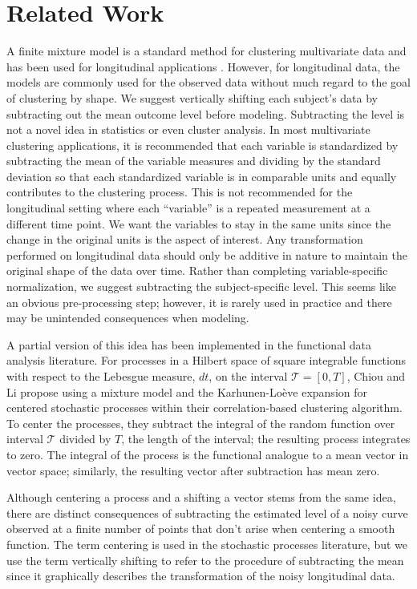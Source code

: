 \documentclass[12pt]{article}
\begin{document}
\section{Related Work}
A finite mixture model is a standard method for clustering multivariate data \cite{everitt2009} and has been used for longitudinal applications \cite{muthen2010, jones2001}. However, for longitudinal data, the models are commonly used for the observed data without much regard to the goal of clustering by shape. We suggest vertically shifting each subject's data by subtracting out the mean outcome level before modeling. Subtracting the level is not a novel idea in statistics or even cluster analysis. In most multivariate clustering applications, it is recommended that each variable is standardized by subtracting the mean of the variable measures and dividing by the standard deviation so that each standardized variable is in comparable units and equally contributes to the clustering process. This is not recommended for the longitudinal setting where each ``variable'' is a repeated measurement at a different time point. We want the variables to stay in the same units since the change in the original units is the aspect of interest. Any transformation performed on longitudinal data should only be additive in nature to maintain the original shape of the data over time. Rather than completing variable-specific normalization, we suggest subtracting the subject-specific level. This seems like an obvious pre-processing step; however, it is rarely used in practice and there may be unintended consequences when modeling.

A partial version of this idea has been implemented in the functional data analysis literature. For processes in a Hilbert space of square integrable functions with respect to the Lebesgue measure, $dt$, on the interval $\mathcal{T}=[0,T]$, Chiou and Li \cite{chiou2008} propose using a mixture model and the Karhunen-Lo{\`e}ve expansion for centered stochastic processes within their correlation-based clustering algorithm. To center the processes, they subtract the integral of the random function over interval $\mathcal{T}$ divided by $T$, the length of the interval; the resulting process integrates to zero. The integral of the process is the functional analogue to a mean vector in vector space; similarly, the resulting vector after subtraction has mean zero.

 Although centering a process and a shifting a vector stems from the same idea, there are distinct consequences of subtracting the estimated level of a noisy curve observed at a finite number of points that don't arise when centering a smooth function. The term centering is used in the stochastic processes literature, but we use the term vertically shifting to refer to the procedure of subtracting the mean since it graphically describes the transformation of the noisy longitudinal data.
\end{document}

